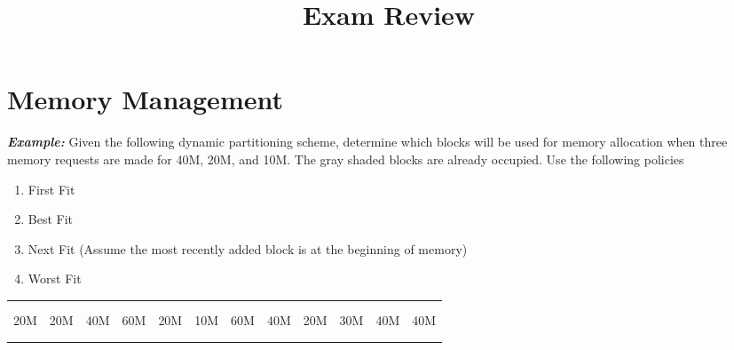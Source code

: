 \documentclass{article}
\title{Exam Review}
\date{}
\newcommand{\bc}{\cellcolor{blue!60}}
\newcommand{\gc}{\cellcolor{black!50}}
\newcommand{\Example}{\textit{\textbf{Example: }}}
\begin{document}
\maketitle
\section{Memory Management}
\Example Given the following dynamic partitioning scheme, determine which blocks will be used for memory allocation when three memory requests are made for 40M, 20M, and 10M.
The gray shaded blocks are already occupied.
Use the following policies
\begin{enumerate}
\item First Fit
\item Best Fit
\item Next Fit (Assume the most recently added block is at the beginning of memory)
\item Worst Fit
\end{enumerate}
\vspace{0.2cm}
\begin{center}
\begin{tabular}{|c|c|c|c|c|c|c|c|c|c|c|c|}
\hline
\gc &   &\gc &   &\gc &   &\gc &   &\gc &   &\gc & \\
\gc &   &\gc &   &\gc &   &\gc &   &\gc &   &\gc & \\
\hline
20M & 20M & 40M & 60M & 20M & 10M & 60M & 40M & 20M & 30M & 40M & 40M\\
\hline
\gc &\bc &\gc &  &\gc &\bc &\gc &\bc &\gc &   &\gc & \\
\gc &\bc &\gc &  &\gc &\bc &\gc &\bc &\gc &   &\gc & \\
\hline

\end{tabular}
\end{center}
\end{document}
